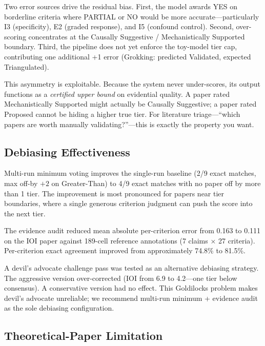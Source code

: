 \documentclass[10pt]{article}
\begin{document}
Two error sources drive the residual bias. First, the model awards YES on borderline criteria where PARTIAL or NO would be more accurate---particularly I3 (specificity), E2 (graded response), and I5 (confound control). Second, over-scoring concentrates at the Causally Suggestive / Mechanistically Supported boundary. Third, the pipeline does not yet enforce the toy-model tier cap, contributing one additional +1 error (Grokking: predicted Validated, expected Triangulated).

This asymmetry is exploitable. Because the system never under-scores, its output functions as a \emph{certified upper bound} on evidential quality. A paper rated Mechanistically Supported might actually be Causally Suggestive; a paper rated Proposed cannot be hiding a higher true tier. For literature triage---``which papers are worth manually validating?''---this is exactly the property you want.

\subsection{Debiasing Effectiveness}

Multi-run minimum voting improves the single-run baseline (2/9 exact matches, max off-by $+2$ on Greater-Than) to 4/9 exact matches with no paper off by more than 1 tier. The improvement is most pronounced for papers near tier boundaries, where a single generous criterion judgment can push the score into the next tier.

The evidence audit reduced mean absolute per-criterion error from 0.163 to 0.111 on the IOI paper against 189-cell reference annotations (7 claims $\times$ 27 criteria). Per-criterion exact agreement improved from approximately 74.8\% to 81.5\%.

A devil's advocate challenge pass was tested as an alternative debiasing strategy. The aggressive version over-corrected (IOI from 6.9 to 4.2---one tier below consensus). A conservative version had no effect. This Goldilocks problem makes devil's advocate unreliable; we recommend multi-run minimum + evidence audit as the sole debiasing configuration.


\subsection{Theoretical-Paper Limitation}
\end{document}
